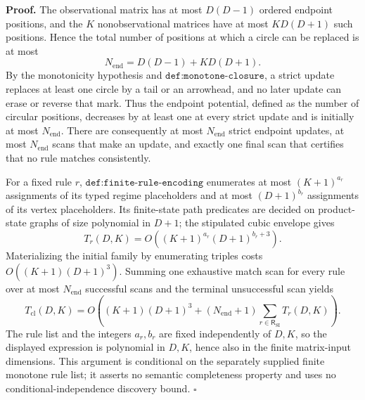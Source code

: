 \textbf{Proof.}
The observational matrix has at most \(D(D-1)\) ordered endpoint positions, and the \(K\) nonobservational matrices have at most \(KD(D+1)\) such positions.  Hence the total number of positions at which a circle can be replaced is at most
\[
N_{\mathrm{end}}=D(D-1)+KD(D+1).
\]
By the monotonicity hypothesis and \(\texttt{def:monotone-closure}\), a strict update replaces at least one circle by a tail or an arrowhead, and no later update can erase or reverse that mark.  Thus the endpoint potential, defined as the number of circular positions, decreases by at least one at every strict update and is initially at most \(N_{\mathrm{end}}\).  There are consequently at most \(N_{\mathrm{end}}\) strict endpoint updates, at most \(N_{\mathrm{end}}\) scans that make an update, and exactly one final scan that certifies that no rule matches consistently.

For a fixed rule \(r\), \(\texttt{def:finite-rule-encoding}\) enumerates at most \((K+1)^{a_r}\) assignments of its typed regime placeholders and at most \((D+1)^{b_r}\) assignments of its vertex placeholders.  Its finite-state path predicates are decided on product-state graphs of size polynomial in \(D+1\); the stipulated cubic envelope gives
\[
T_r(D,K)=O\!\left((K+1)^{a_r}(D+1)^{b_r+3}\right).
\]
Materializing the initial family by enumerating triples costs \(O((K+1)(D+1)^3)\).  Summing one exhaustive match scan for every rule over at most \(N_{\mathrm{end}}\) successful scans and the terminal unsuccessful scan yields
\[
T_{\mathrm{cl}}(D,K)
=O\!\left((K+1)(D+1)^3
+(N_{\mathrm{end}}+1)\sum_{r\in\mathsf R_{\mathrm{SI}}}T_r(D,K)\right).
\]
The rule list and the integers \(a_r,b_r\) are fixed independently of \(D,K\), so the displayed expression is polynomial in \(D,K\), hence also in the finite matrix-input dimensions.  This argument is conditional on the separately supplied finite monotone rule list; it asserts no semantic completeness property and uses no conditional-independence discovery bound. \(\square\)